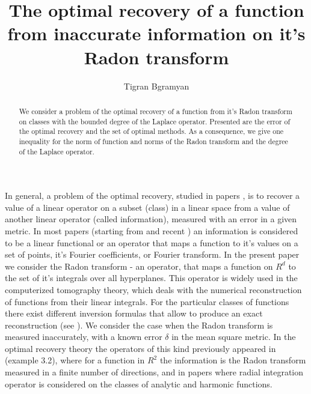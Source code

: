\documentclass[12pt]{iopart}
\begin{document}
\title[The optimal recovery of a function from inaccurate information on it's Radon transform]{The optimal recovery of a function from inaccurate information on it's Radon transform}
\author{Tigran Bgramyan}
\address{Peoples' Friendship University of Russia, Moscow, Ordzonikidze 3, 117198}
\begin{abstract}

We consider a problem of the optimal recovery of a function from it's Radon transform on classes with the bounded degree of the Laplace operator. Presented are the error of the optimal recovery and the set of optimal methods. As a consequence, we give one inequality for the norm of function and norms of the Radon transform and the degree of the Laplace operator.

\end{abstract}
\maketitle

In general, a problem of the optimal recovery, studied in papers \cite{MR,MR1,MO}, is to recover a value of a linear operator on a subset (class) in a linear space from a value of another linear operator (called information), measured with an error in a given metric. In most papers (starting from \cite{O} and recent \cite{OS,MO3}) an information is considered to be a linear functional or an operator that maps a function to it's values on a set of points, it's Fourier coefficients, or Fourier transform. In the present paper we consider the Radon transform - an operator, that maps a function on $R^d$ to the set of it's integrals over all hyperplanes. This operator is widely used in the computerized tomography theory, which deals with the numerical reconstruction of functions from their linear integrals. For the particular classes of functions there exist different inversion formulas that allow to produce an exact reconstruction (see \cite{Na}). We consider the case when the Radon transform is measured inaccurately, with a known error $\delta$ in the mean square metric. In the optimal recovery theory the operators of this kind previously appeared in \cite{LS} (example 3.2), where for a function in $R^2$ the information is the Radon transform measured in a finite number of directions, and in papers \cite{D,B} where radial integration operator is considered on the classes of analytic and harmonic functions. 
\end{document}
